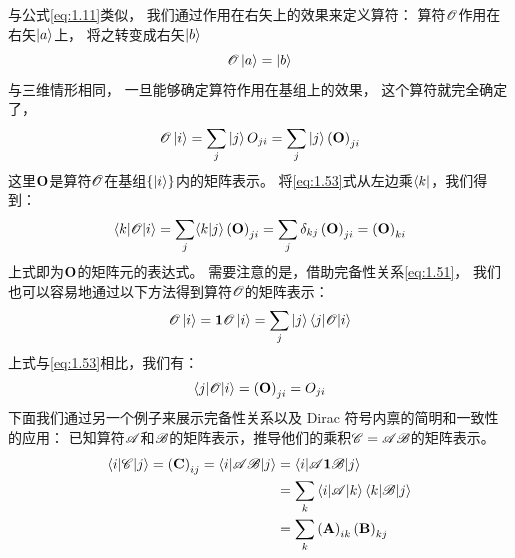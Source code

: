与公式\eqref{eq:1.11}类似，
我们通过作用在右矢上的效果来定义算符：
算符$\mathscr{O}$作用在右矢$\Ket{a}$上，
将之转变成右矢$\Ket{b}$
\begin{equation}
 \mathscr{O}\Ket{a} = \Ket{b}
 \label{eq:1.52}
\end{equation}
与三维情形相同，
一旦能够确定算符作用在基组上的效果，
这个算符就完全确定了，
\begin{equation}
 \mathscr{O}\Ket{i} = \sum_j\Ket{j}O_{ji} = \sum_j\Ket{j}\left(\mathbf{O}\right)_{ji}
 \label{eq:1.53}
\end{equation}
这里$\mathbf O$是算符$\mathscr{O}$在基组$\left\{ \Ket{i} \right\}$内的矩阵表示。
将\eqref{eq:1.53}式从左边乘$\Bra{k}$，我们得到：
\begin{equation}
 \left\langle k\middle\vert \mathscr{O} \middle\vert i\right\rangle = \sum_j\langle k \vert j \rangle\left(\mathbf O\right)_{ji} = \sum_j\delta_{kj} \left(\mathbf O\right)_{ji} = \left(\mathbf O\right)_{ki}
 \label{eq:1.54}
\end{equation}
上式即为$\mathbf O$的矩阵元的表达式。
需要注意的是，借助完备性关系\eqref{eq:1.51}，
我们也可以容易地通过以下方法得到算符$\mathscr{O}$的矩阵表示：
\begin{equation}
 \mathscr{O}\Ket{i} = {\mathbf 1}\mathscr{O}\Ket{i} = \sum_j\Ket{j}\left\langle j\middle\vert \mathscr{O} \middle\vert i\right\rangle
 \label{eq:1.55}
\end{equation}
上式与\eqref{eq:1.53}相比，我们有：
\begin{equation}
 \left\langle j\middle\vert \mathscr{O} \middle\vert i\right\rangle = \left(\mathbf O\right)_{ji} = O_{ji}
 \label{eq:1.56}
\end{equation}
下面我们通过另一个例子来展示完备性关系以及 Dirac 符号内禀的简明和一致性的应用：
已知算符$\mathscr{A}$和$\mathscr{B}$的矩阵表示，推导他们的乘积$\mathscr{C} = \mathscr{A}\mathscr{B}$的矩阵表示。
\[
\begin{split}
 \left\langle i\middle\vert \mathscr{C} \middle\vert j\right\rangle = \left(\mathbf C\right)_{ij} = \left\langle i\middle\vert \mathscr{AB} \middle\vert j\right\rangle &= \left\langle i\middle\vert\mathscr{A}\mathbf{1}\mathscr{B}\middle\vert j\right\rangle \\
 &= \sum_k \left\langle i\middle\vert \mathscr{A} \middle\vert k\right\rangle \left\langle k\middle\vert \mathscr{B} \middle\vert j\right\rangle \\
 &= \sum_k \left(\mathbf A\right)_{ik} \left(\mathbf B\right)_{kj}
\end{split}
\]

